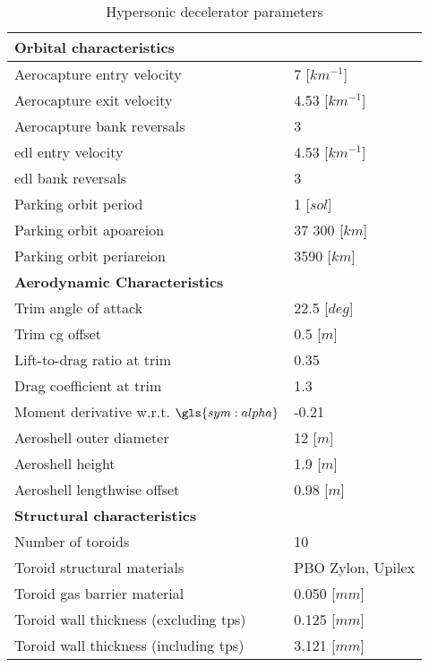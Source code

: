 \begin{table}[H]
	\centering
	\caption{Hypersonic decelerator parameters}
	\label{tab:DeceleratorPar}
	\begin{tabular}{|p{}|p{}|} \hline
		\textbf{Orbital characteristics}             	& 			\\ \hline \hline
		Aerocapture entry velocity       				&	 7 [$km^{-1}$] 		\\ \hline
		Aerocapture exit velocity				 		&    4.53 [$km^{-1}$]  	  	\\ \hline
		Aerocapture bank reversals				        &  	 3 		\\ \hline
		\gls{edl} entry velocity					 	&  	 4.53 [$km^{-1}$]	\\ \hline
		\gls{edl} bank reversals					 	&  	 3	\\ \hline
		Parking orbit period						 	&  	 1 [$sol$]		\\ \hline
		Parking orbit apoareion			 				&  	37 300 [$km$]		\\ \hline
		Parking orbit periareion			 			&  	3590 [$km$]		\\ \hline
		\textbf{Aerodynamic Characteristics}			&			\\ \hline \hline
		Trim angle of attack				 			&  22.5 [$deg$]			\\ \hline
		Trim \gls{cg} offset							&  0.5 [$m$]		\\ \hline
		Lift-to-drag ratio at trim			 			&  	0.35	\\ \hline
		Drag coefficient at trim			 			&  	1.3	\\ \hline
		Moment derivative w.r.t. $\gls{sym:alpha}$		&  	-0.21		\\ \hline
		Aeroshell outer diameter						&  	12 [$m$]		\\ \hline
		Aeroshell height								&  	1.9 [$m$]		\\ \hline
		Aeroshell lengthwise offset						&  	0.98 [$m$]		\\ \hline
		\textbf{Structural characteristics}				&			\\ \hline \hline
		Number of toroids					 			&   10			\\ \hline 
		Toroid structural materials						 			&  	PBO Zylon\textsuperscript{\textregistered}, Upilex		\\ \hline
		Toroid gas barrier material		&	0.050 [$mm$]		\\ \hline
		Toroid wall thickness (excluding \gls{tps})		&	0.125 [$mm$]		\\ \hline
		Toroid wall thickness (including \gls{tps})		&	3.121 [$mm$]		\\ \hline

\end{tabular}
\end{table}
